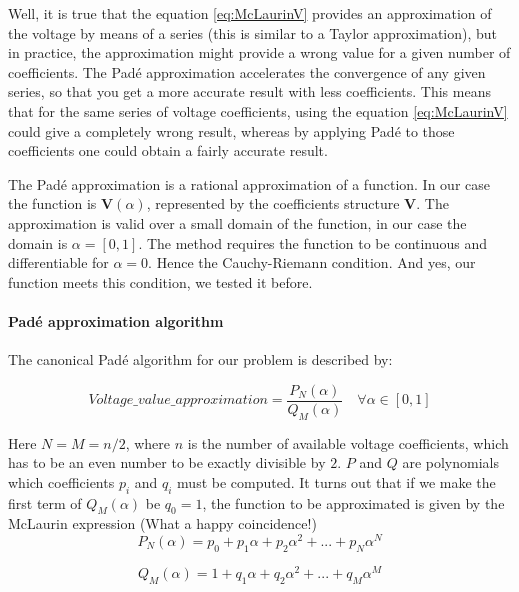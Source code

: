 \documentclass[a4paper,twoside,fleqn]{tufte-book}
\begin{document}
Well, it is true that the equation \ref{eq:McLaurinV} provides an approximation of the voltage by means of a series (this is similar to a Taylor approximation), but in practice, the approximation might provide a wrong value for a given number of coefficients. The Pad\'e approximation accelerates the convergence of any given series, so that you get a more accurate result with less coefficients. This means that for the same series of voltage coefficients, using the equation \ref{eq:McLaurinV} could give a completely wrong result, whereas by applying Pad\'e to those coefficients one could obtain a fairly accurate result.

The Pad\'e approximation is a rational approximation of a function. In our case the function is $\textbf{V}(\alpha)$, represented by the coefficients structure $\textbf{V}$. The approximation is valid over a small domain of the function, in our case the domain is $\alpha=[0,1]$. The method requires the function to be continuous and differentiable for $\alpha=0$. Hence the Cauchy-Riemann condition. And yes, our function meets this condition, we tested it before.

\paragraph{Pad\'e approximation algorithm}

The canonical Pad\'e algorithm for our problem is described by:

\begin{equation}
Voltage\_value\_approximation = \frac{P_N(\alpha)}{Q_M(\alpha)} \quad \forall \alpha \in [0,1]
\label{eq:pade_apprx}
\end{equation}

Here $N=M=n/2$, where $n$ is the number of available voltage coefficients, which has to be an even number to be exactly divisible by $2$. $P$ and $Q$ are polynomials which coefficients $p_i$ and $q_i$ must be computed. It turns out that if we make the first term of $Q_M(\alpha)$ be $q_0=1$, the function to be approximated is given by the McLaurin expression (What a happy coincidence!)
\begin{equation}
P_N(\alpha) = p_0 + p_1\alpha + p_2\alpha^2 + ... + p_N\alpha^N
\end{equation}

\begin{equation}
Q_M(\alpha) = 1 + q_1\alpha + q_2\alpha^2 + ... + q_M\alpha^M
\end{equation}
\end{document}
